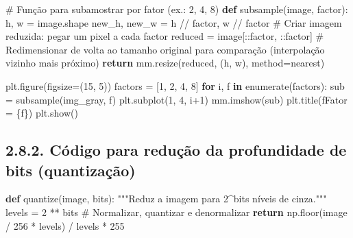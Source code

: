 \documentclass[
  portuguese,
  letterpaper,
  openany,
  oneside,
  12pt,
  a4paper]{book}
\newenvironment{Shaded}{\begin{snugshade}}{\end{snugshade}}
\newcommand{\BuiltInTok}[1]{\textcolor[rgb]{0.00,0.23,0.31}{#1}}
\newcommand{\CommentTok}[1]{\textcolor[rgb]{0.37,0.37,0.37}{#1}}
\newcommand{\ControlFlowTok}[1]{\textcolor[rgb]{0.00,0.23,0.31}{\textbf{#1}}}
\newcommand{\DecValTok}[1]{\textcolor[rgb]{0.68,0.00,0.00}{#1}}
\newcommand{\KeywordTok}[1]{\textcolor[rgb]{0.00,0.23,0.31}{\textbf{#1}}}
\newcommand{\NormalTok}[1]{\textcolor[rgb]{0.00,0.23,0.31}{#1}}
\newcommand{\OperatorTok}[1]{\textcolor[rgb]{0.37,0.37,0.37}{#1}}
\newcommand{\SpecialCharTok}[1]{\textcolor[rgb]{0.37,0.37,0.37}{#1}}
\newcommand{\SpecialStringTok}[1]{\textcolor[rgb]{0.13,0.47,0.30}{#1}}
\newcommand{\StringTok}[1]{\textcolor[rgb]{0.13,0.47,0.30}{#1}}
\begin{document}
\begin{tcolorbox}
\begin{Shaded}
\begin{Highlighting}[]
\CommentTok{\# Função para subamostrar por fator (ex.: 2, 4, 8)}
\KeywordTok{def}\NormalTok{ subsample(image, factor):}
\NormalTok{    h, w }\OperatorTok{=}\NormalTok{ image.shape}
\NormalTok{    new\_h, new\_w }\OperatorTok{=}\NormalTok{ h }\OperatorTok{//}\NormalTok{ factor, w }\OperatorTok{//}\NormalTok{ factor}
    \CommentTok{\# Criar imagem reduzida: pegar um pixel a cada \textquotesingle{}factor\textquotesingle{}}
\NormalTok{    reduced }\OperatorTok{=}\NormalTok{ image[::factor, ::factor]}
    \CommentTok{\# Redimensionar de volta ao tamanho original para comparação (interpolação vizinho mais próximo)}
    \ControlFlowTok{return}\NormalTok{ mm.resize(reduced, (h, w), method}\OperatorTok{=}\StringTok{\textquotesingle{}nearest\textquotesingle{}}\NormalTok{)}

\NormalTok{plt.figure(figsize}\OperatorTok{=}\NormalTok{(}\DecValTok{15}\NormalTok{, }\DecValTok{5}\NormalTok{))}
\NormalTok{factors }\OperatorTok{=}\NormalTok{ [}\DecValTok{1}\NormalTok{, }\DecValTok{2}\NormalTok{, }\DecValTok{4}\NormalTok{, }\DecValTok{8}\NormalTok{]}
\ControlFlowTok{for}\NormalTok{ i, f }\KeywordTok{in} \BuiltInTok{enumerate}\NormalTok{(factors):}
\NormalTok{    sub }\OperatorTok{=}\NormalTok{ subsample(img\_gray, f)}
\NormalTok{    plt.subplot(}\DecValTok{1}\NormalTok{, }\DecValTok{4}\NormalTok{, i}\OperatorTok{+}\DecValTok{1}\NormalTok{)}
\NormalTok{    mm.imshow(sub)}
\NormalTok{    plt.title(}\SpecialStringTok{f\textquotesingle{}Fator = }\SpecialCharTok{\{}\NormalTok{f}\SpecialCharTok{\}}\SpecialStringTok{\textquotesingle{}}\NormalTok{)}
\NormalTok{plt.show()}
\end{Highlighting}
\end{Shaded}

\subsection{2.8.2. Código para redução da profundidade de bits
(quantização)}\label{cuxf3digo-para-reduuxe7uxe3o-da-profundidade-de-bits-quantizauxe7uxe3o}

\begin{Shaded}
\begin{Highlighting}[]
\KeywordTok{def}\NormalTok{ quantize(image, bits):}
    \CommentTok{"""Reduz a imagem para 2\^{}bits níveis de cinza."""}
\NormalTok{    levels }\OperatorTok{=} \DecValTok{2} \OperatorTok{**}\NormalTok{ bits}
    \CommentTok{\# Normalizar, quantizar e denormalizar}
    \ControlFlowTok{return}\NormalTok{ np.floor(image }\OperatorTok{/} \DecValTok{256} \OperatorTok{*}\NormalTok{ levels) }\OperatorTok{/}\NormalTok{ levels }\OperatorTok{*} \DecValTok{255}


\end{Highlighting}
\end{Shaded}
\end{tcolorbox}
\end{document}
